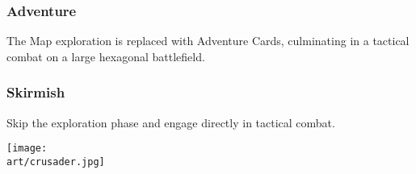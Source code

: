 \begin{multicols*}{2}
\subsubsection*{Adventure}
The Map exploration is replaced with Adventure Cards, culminating in a tactical combat on a large hexagonal battlefield.

\subsubsection*{Skirmish}
Skip the exploration phase and engage directly in tactical combat.

\bigskip
\vspace*{\fill}
\texttt{[image: \\art/crusader.jpg]}
\vspace*{\fill}

\end{multicols*}

